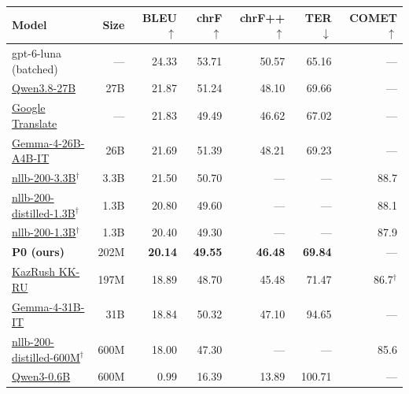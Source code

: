 \begin{tabular*}{\linewidth}{@{\extracolsep{\fill}}lrrrrrr@{}}
\toprule Model & Size & BLEU $\uparrow$ & chrF $\uparrow$ & chrF++ $\uparrow$ & TER $\downarrow$ & COMET $\uparrow$\\
\midrule
gpt-6-luna (batched) & --- & 24.33 & 53.71 & 50.57 & 65.16 & --- \\
\href{https://openrouter.ai/qwen/qwen3.8-27b}{Qwen3.8-27B} & 27B & 21.87 & 51.24 & 48.10 & 69.66 & --- \\
\href{https://translate.google.com/}{Google Translate} & --- & 21.83 & 49.49 & 46.62 & 67.02 & --- \\
\href{https://openrouter.ai/google/gemma-4-26b-a4b-it}{Gemma-4-26B-A4B-IT} & 26B & 21.69 & 51.39 & 48.21 & 69.23 & --- \\
\href{https://huggingface.co/facebook/nllb-200-3.3B}{nllb-200-3.3B}$^\dagger$ & 3.3B & 21.50 & 50.70 & --- & --- & 88.7 \\
\href{https://huggingface.co/facebook/nllb-200-distilled-1.3B}{nllb-200-distilled-1.3B}$^\dagger$ & 1.3B & 20.80 & 49.60 & --- & --- & 88.1 \\
\href{https://huggingface.co/facebook/nllb-200-1.3B}{nllb-200-1.3B}$^\dagger$ & 1.3B & 20.40 & 49.30 & --- & --- & 87.9 \\
\textbf{P0 (ours)} & 202M & \textbf{20.14} & \textbf{49.55} & \textbf{46.48} & \textbf{69.84} & --- \\
\href{https://huggingface.co/deepvk/kazRush-kk-ru}{KazRush KK-RU} & 197M & 18.89 & 48.70 & 45.48 & 71.47 & 86.7$^\dagger$ \\
\href{https://openrouter.ai/google/gemma-4-31b-it}{Gemma-4-31B-IT} & 31B & 18.84 & 50.32 & 47.10 & 94.65 & --- \\
\href{https://huggingface.co/facebook/nllb-200-distilled-600M}{nllb-200-distilled-600M}$^\dagger$ & 600M & 18.00 & 47.30 & --- & --- & 85.6 \\
\href{https://huggingface.co/Qwen/Qwen3-0.6B}{Qwen3-0.6B} & 600M & 0.99 & 16.39 & 13.89 & 100.71 & --- \\
\bottomrule
\end{tabular*}
